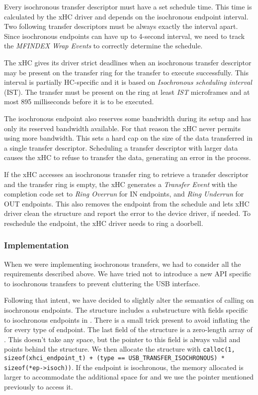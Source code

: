 Every isochronous transfer descriptor must have a set schedule time. This time
is calculated by the xHC driver and depends on the isochronous endpoint interval.
Two following transfer descriptors must be always exactly the interval apart.
Since isochronous endpoints can have up to 4-second interval, we need to
track the \textit{MFINDEX Wrap Events} to correctly determine the schedule.

The xHC gives its driver strict deadlines when an isochronous transfer descriptor
may be present on the transfer ring for the transfer to execute successfully.
This interval is partially HC-specific and it is based on \textit{Isochronous
scheduling interval} (IST). The transfer must be present on the ring at least
\textit{IST} microframes and at most 895 milliseconds before it is to be
executed.

The isochronous endpoint also reserves some bandwidth during its setup and has
only its reserved bandwidth available. For that reason the xHC never permits using
more bandwidth. This sets a hard cap on the size of the data transferred in a
single transfer descriptor. Scheduling a transfer descriptor with larger data
causes the xHC to refuse to transfer the data, generating an error in the process.

If the xHC accesses an isochronous transfer ring to retrieve a transfer
descriptor and the transfer ring is empty, the xHC generates a \textit{Transfer Event}
with the completion code set to \textit{Ring Overrun} for IN endpoints, and
\textit{Ring Underrun} for OUT endpoints. This also removes the endpoint from
the schedule and lets xHC driver clean the structure and report the error to the device
driver, if needed. To reschedule the endpoint, the xHC driver needs to ring a
doorbell.

\subsubsection{Implementation}

When we were implementing isochronous transfers, we had to consider all the
requirements described above. We have tried not to introduce a new API specific to
isochronous transfers to prevent cluttering the USB interface.

Following that intent, we have decided to slightly alter the
semantics of calling  on isochronous
endpoints. The  structure includes a substructure with
fields specific to isochronous endpoints in . There is a
small trick present to avoid inflating the  for every
type of endpoint. The last field of the structure is a zero-length array of
. This doesn't take any space, but the pointer to this
field is always valid and points behind the structure. We then allocate the
structure with \texttt{calloc(1, sizeof(xhci\_endpoint\_t) + (type ==
USB\_TRANSFER\_ISOCHRONOUS) * sizeof(*ep->isoch))}. If the endpoint is
isochronous, the memory allocated is larger to accommodate the additional space for
 and we use the pointer mentioned previously to access it.

